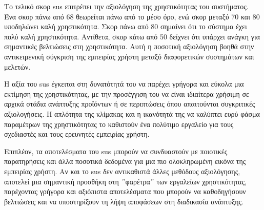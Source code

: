 Το τελικό σκορ \acrshort{sus} επιτρέπει την αξιολόγηση της χρηστικότητας του συστήματος. Ένα σκορ πάνω από 68 θεωρείται πάνω από το μέσο όρο, ενώ σκορ μεταξύ 70 και 80 υποδηλώνει καλή χρηστικότητα. Σκορ πάνω από 80 σημαίνει ότι το σύστημα έχει πολύ καλή χρηστικότητα. Αντίθετα, σκορ κάτω από 50 δείχνει ότι υπάρχει ανάγκη για σημαντικές βελτιώσεις στη χρηστικότητα. Αυτή η ποσοτική αξιολόγηση βοηθά στην αντικειμενική σύγκριση της εμπειρίας χρήστη μεταξύ διαφορετικών συστημάτων και μελετών\cite{noauthor_system_nodate}.

Η αξία του \acrshort{sus} έγκειται στη δυνατότητά του να παρέχει γρήγορα και εύκολα μια εκτίμηση της χρηστικότητας, με την προσέγγιση του να είναι ιδιαίτερα χρήσιμη σε αρχικά στάδια ανάπτυξης προϊόντων ή σε περιπτώσεις όπου απαιτούνται συγκριτικές αξιολογήσεις. Η απλότητα της κλίμακας και η ικανότητά της να καλύπτει ευρύ φάσμα παραμέτρων της χρηστικότητας το καθιστούν ένα πολύτιμο εργαλείο για τους σχεδιαστές και τους ερευνητές εμπειρίας χρήστη.

Επιπλέον, τα αποτελέσματα του \acrshort{sus} μπορούν να συνδυαστούν με ποιοτικές παρατηρήσεις και άλλα ποσοτικά δεδομένα για μια πιο ολοκληρωμένη εικόνα της εμπειρίας χρήστη. Αν και το \acrshort{sus} δεν αντικαθιστά άλλες μεθόδους αξιολόγησης, αποτελεί μια σημαντική προσθήκη στη \("\)φαρέτρα\("\) των εργαλείων χρηστικότητας, παρέχοντας γρήγορα και αξιόπιστα αποτελέσματα που μπορούν να καθοδηγήσουν βελτιώσεις και να υποστηρίξουν τη λήψη αποφάσεων στη διαδικασία ανάπτυξης.
